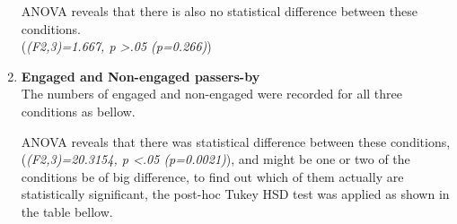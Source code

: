 \begin{enumerate}
\begin{table}[H]
\caption{Cross tabulation for each condition Honeypot effect }
\label{tab:newbodyhoneypoteffect}
\centering
{}
\end{table}

ANOVA reveals that there is also no statistical difference between these conditions. \\
(\emph{(F2,3)=1.667, p >.05 (p=0.266)})



\item \textbf{Engaged and Non-engaged passers-by} \\
The numbers of engaged and non-engaged were recorded for all three conditions as bellow.

\begin{table}[H]
\caption{Number of engaged passers-by in three weeks}
\label{tab:engagedofthreeweeks}
\centering
{}
\end{table}

ANOVA reveals that there was statistical difference between these conditions, (\emph{(F2,3)=20.3154, p <.05 (p=0.0021)}), and might be one or two of the conditions be of big difference, to find out which of them actually are statistically significant, the post-hoc Tukey HSD test was applied as shown in the table bellow.


\end{enumerate}
